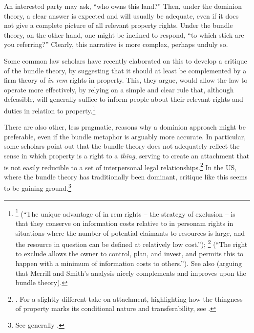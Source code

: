 An interested party may ask, ``who owns this land?'' Then, under the dominion theory, a clear answer is expected and will usually be adequate, even if it does not give a complete picture of all relevant property rights. Under the bundle theory, on the other hand, one might be inclined to respond, ``to which stick are you referring?'' Clearly, this narrative is more complex, perhaps unduly so. 

Some common law scholars have recently elaborated on this to develop a critique of the bundle theory, by suggesting that it should at least be complemented by a firm theory of {\it in rem} rights in property. This, they argue, would allow the law to operate more effectively, by relying on a simple and clear rule that, although defeasible, will generally suffice to inform people about their relevant rights and duties in relation to property.\footnote{\footcite[793]{merrill01b} (``The unique advantage of in rem rights -- the strategy of exclusion -- is that they conserve on information costs relative to in personam rights in situations where the number of potential claimants to resources is large, and the resource in question can be defined at relatively low cost.''); \footcite[389]{merrill01} (``The right to exclude allows the owner to control, plan, and invest, and permits this to happen with a minimum of information costs to others.''). See also \cite{ellickson11} (arguing that Merrill and Smith's analysis nicely complements and improves upon the bundle theory).} 

There are also other, less pragmatic, reasons why a dominion approach might be preferable, even if the bundle metaphor is arguably more accurate. In particular, some scholars point out that the bundle theory does not adequately reflect the sense in which property is a right to a {\it thing}, serving to create an attachment that is not easily reducible to a set of interpersonal legal relationships.\footnote{\cite[1862]{merrill07}. For a slightly different take on attachment, highlighting how the thingness of property marks its conditional nature and transferability, see \cite[799-818]{penner96}.} In the US, where the bundle theory has traditionally been dominant, critique like this seems to be gaining ground.\footnote{See generally \cite{foster10}.}

